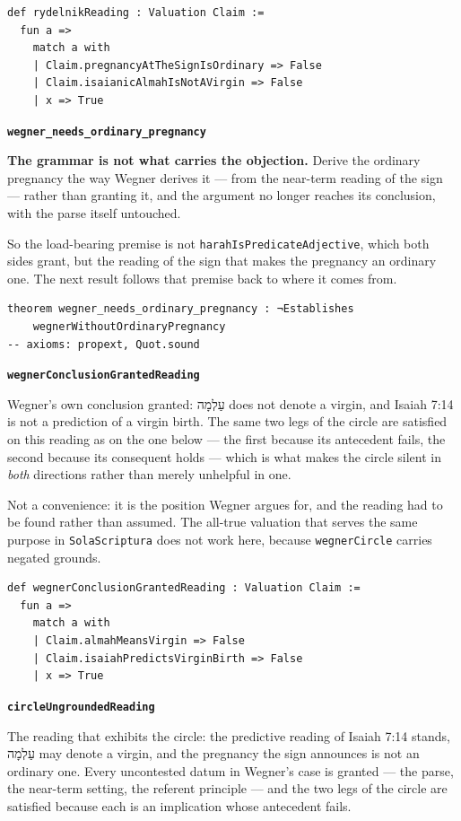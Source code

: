 \documentclass[11pt]{article}
\begin{document}
{\small\begin{verbatim}
def rydelnikReading : Valuation Claim :=
  fun a =>
    match a with
    | Claim.pregnancyAtTheSignIsOrdinary => False
    | Claim.isaianicAlmahIsNotAVirgin => False
    | x => True
\end{verbatim}}
\par\medskip\noindent\textbf{\texttt{wegner\_\allowbreak{}needs\_\allowbreak{}ordinary\_\allowbreak{}pregnancy}}\par\nobreak\noindent
\textbf{The grammar is not what carries the objection.} Derive the ordinary pregnancy the way Wegner derives it — from the near-term reading of the sign — rather than granting it, and the argument no longer reaches its conclusion, with the parse itself untouched.

So the load-bearing premise is not \texttt{harah\allowbreak{}Is\allowbreak{}Predicate\allowbreak{}Adjective}, which both sides grant, but the reading of the sign that makes the pregnancy an ordinary one. The next result follows that premise back to where it comes from.

{\small\begin{verbatim}
theorem wegner_needs_ordinary_pregnancy : ¬Establishes
    wegnerWithoutOrdinaryPregnancy
-- axioms: propext, Quot.sound
\end{verbatim}}
\par\medskip\noindent\textbf{\texttt{wegner\allowbreak{}Conclusion\allowbreak{}Granted\allowbreak{}Reading}}\par\nobreak\noindent
Wegner's own conclusion granted: עַלְמָה does not denote a virgin, and Isaiah 7:14 is not a prediction of a virgin birth. The same two legs of the circle are satisfied on this reading as on the one below — the first because its antecedent fails, the second because its consequent holds — which is what makes the circle silent in \emph{both} directions rather than merely unhelpful in one.

Not a convenience: it is the position Wegner argues for, and the reading had to be found rather than assumed. The all-true valuation that serves the same purpose in \texttt{Sola\allowbreak{}Scriptura} does not work here, because \texttt{wegner\allowbreak{}Circle} carries negated grounds.

{\small\begin{verbatim}
def wegnerConclusionGrantedReading : Valuation Claim :=
  fun a =>
    match a with
    | Claim.almahMeansVirgin => False
    | Claim.isaiahPredictsVirginBirth => False
    | x => True
\end{verbatim}}
\par\medskip\noindent\textbf{\texttt{circle\allowbreak{}Ungrounded\allowbreak{}Reading}}\par\nobreak\noindent
The reading that exhibits the circle: the predictive reading of Isaiah 7:14 stands, עַלְמָה may denote a virgin, and the pregnancy the sign announces is not an ordinary one. Every uncontested datum in Wegner's case is granted — the parse, the near-term setting, the referent principle — and the two legs of the circle are satisfied because each is an implication whose antecedent fails.
\end{document}

